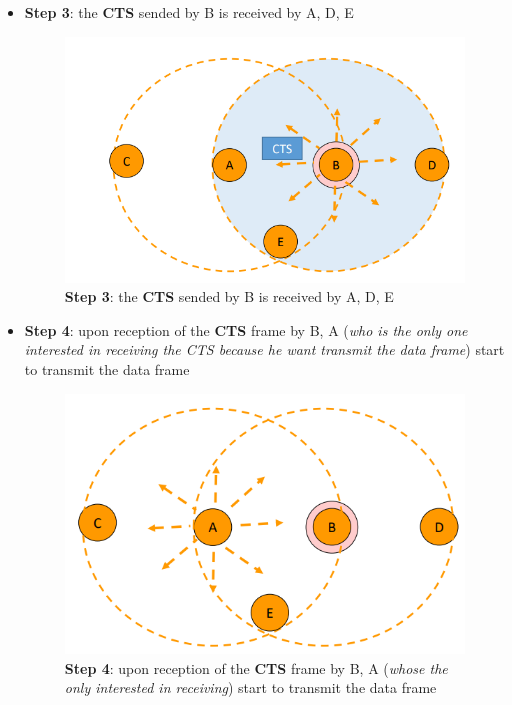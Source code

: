 \documentclass[10pt,a4paper]{report}
\theoremstyle{definition}
\begin{document}
\begin{itemize}
	\item 
	\textbf{Step 3}: the \textbf{CTS} sended by B is received by A, D, E
	\begin{figure}[h!]
		\centering
		\includegraphics[scale=0.50]{images/Pasted image 20230225102504.png}
		\caption{\textbf{Step 3}: the \textbf{CTS} sended by B is received by A, D, E}
	\end{figure}
	
	\item 
	\textbf{Step 4}: upon reception of the \textbf{CTS} frame by B, A (\textit{who is the only one interested in receiving the CTS because he want transmit the data frame}) start to transmit the data frame
	\begin{figure}[h!]
		\centering
		\includegraphics[scale=0.50]{images/Pasted image 20230225102530.png}
		\caption{\textbf{Step 4}: upon reception of the \textbf{CTS} frame by B, A (\textit{whose the only interested in receiving}) start to transmit the data frame}
	\end{figure}
	
\end{itemize}
\end{document}
